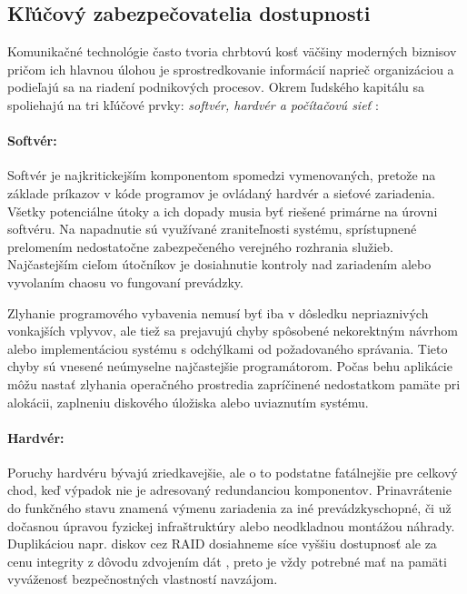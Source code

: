 \documentclass[12pt, a4paper]{article}
\begin{document}
\subsection{Kľúčový zabezpečovatelia dostupnosti}
Komunikačné technológie často tvoria chrbtovú kosť väčšiny moderných biznisov pričom ich hlavnou úlohou je 
sprostredkovanie informácií naprieč organizáciou a podieľajú sa na riadení podnikových procesov. Okrem 
ľudského kapitálu sa spoliehajú na tri kľúčové prvky: \emph{softvér, hardvér a počítačovú sieť} 
\cite{availability}:

\paragraph{Softvér:}
Softvér je najkritickejším komponentom spomedzi vymenovaných, pretože na základe príkazov v kóde programov 
je ovládaný hardvér a sieťové zariadenia. Všetky potenciálne útoky a ich dopady musia byť riešené primárne 
na úrovni softvéru. Na napadnutie sú využívané zraniteľnosti systému, sprístupnené prelomením nedostatočne 
zabezpečeného verejného rozhrania služieb. Najčastejším cieľom útočníkov je dosiahnutie kontroly nad 
zariadením alebo vyvolaním chaosu vo fungovaní prevádzky. 
 
Zlyhanie programového vybavenia nemusí byť iba v dôsledku nepriaznivých vonkajších vplyvov, ale tiež sa 
prejavujú chyby spôsobené nekorektným návrhom alebo implementáciou systému s odchýlkami od
požadovaného správania. Tieto chyby sú  vnesené neúmyselne najčastejšie programátorom. Počas behu aplikácie 
môžu nastať zlyhania operačného prostredia zapríčinené nedostatkom pamäte pri alokácii, zaplneniu diskového 
úložiska alebo uviaznutím systému. 

\paragraph{Hardvér:}
Poruchy hardvéru bývajú zriedkavejšie, ale o to podstatne fatálnejšie pre celkový chod, keď
výpadok nie je adresovaný redundanciou komponentov. Prinavrátenie do funkčného stavu znamená výmenu
zariadenia za iné prevádzkyschopné, či už dočasnou úpravou fyzickej infraštruktúry alebo neodkladnou 
montážou náhrady. Duplikáciou napr. diskov cez RAID dosiahneme síce vyššiu dostupnosť ale za cenu integrity 
z dôvodu zdvojením dát \cite{availability}, preto je vždy potrebné mať na pamäti vyváženosť bezpečnostných 
vlastností navzájom.
\end{document}
